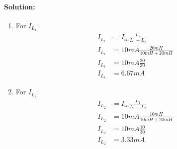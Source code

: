 \paragraph{Solution:}
\begin{enumerate}
  \item For \(I_{L_1}\):
    \begin{align*}
      I_{L_1} &= I_{in} \frac{L_2}{L_1 + L_2} \\
      I_{L_1} &= 10mA \frac{20mH}{10mH + 20mH} \\
      I_{L_1} &= 10mA \frac{20}{30} \\
      I_{L_1} &= 6.67mA
    \end{align*}
  \item For \(I_{L_2}\):
    \begin{align*}
      I_{L_2} &= I_{in} \frac{L_1}{L_1 + L_2} \\
      I_{L_2} &= 10mA \frac{10mH}{10mH + 20mH} \\
      I_{L_2} &= 10mA \frac{10}{30} \\
      I_{L_2} &= 3.33mA
    \end{align*}
\end{enumerate}

